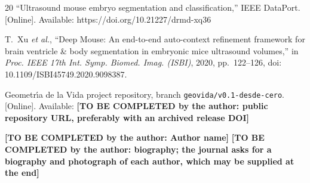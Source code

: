 \documentclass[journal,twoside]{IEEEtran}
\newcommand{\TBC}[1]{\textbf{[TO BE COMPLETED by the author: #1]}}
\begin{document}
\begin{thebibliography}{20}
``Ultrasound mouse embryo segmentation and classification,'' IEEE DataPort. [Online]. Available:
https://doi.org/10.21227/drmd-xq36

T.~Xu \emph{et al.}, ``Deep Mouse: An end-to-end auto-context refinement framework for brain ventricle \& body
segmentation in embryonic mice ultrasound volumes,'' in \emph{Proc. IEEE 17th Int. Symp. Biomed. Imag. (ISBI)},
2020, pp.~122--126, doi: 10.1109/ISBI45749.2020.9098387.

Geometr\'{\i}a de la Vida project repository, branch \texttt{geovida/v0.1-desde-cero}. [Online]. Available:
\TBC{public repository URL, preferably with an archived release DOI}

\end{thebibliography}

\begin{IEEEbiographynophoto}{\TBC{Author name}}
\TBC{biography; the journal asks for a biography and photograph of each author, which may be supplied at the end}
\end{IEEEbiographynophoto}

\vfill
\end{document}
